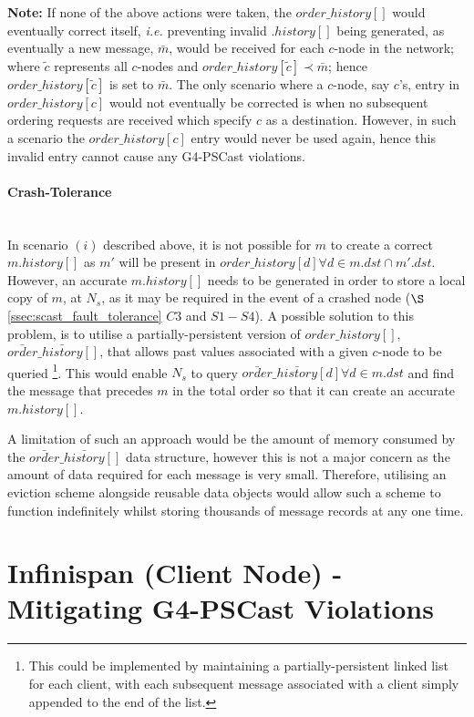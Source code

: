     \textbf{Note: } If none of the above actions were taken, the $order\_history[]$ would eventually correct itself, \emph{i.e.} preventing invalid $.history[]$ being generated, as eventually a new message, $\bar{m}$, would be received for each $c$-node in the network; where $\tilde{c}$ represents all $c$-nodes and $order\_history[\tilde{c}] \prec \bar{m}$; hence $order\_history[\tilde{c}]$ is set to $\bar{m}$.  The only scenario where a $c$-node, say $c$'s, entry in $order\_history[c]$ would not eventually be corrected is when no subsequent ordering requests are received which specify $c$ as a destination.  However, in such a scenario the $order\_history[c]$ entry would never be used again, hence this invalid entry cannot cause any G4-PSCast violations.  
    
    \paragraph{Crash-Tolerance} \hfill \\
    In scenario $(i)$ described above, it is not possible for $m$ to create a correct $m.history[]$ as $m'$ will be present in $order\_history[d] \forall d \in m.dst \cap m'.dst$.  However, an accurate $m.history[]$ needs to be generated in order to store a local copy of $m$, at $N_s$, as it may be required in the event of a crashed node ($\S$ \ref{ssec:scast_fault_tolerance} $C3$ and $S1-S4$).  A possible solution to this problem, is to utilise a partially-persistent version of $order\_history[]$, $\bar{order}\_\bar{history}[]$, that allows past values associated with a given $c$-node to be queried \footnote{This could be implemented by maintaining a partially-persistent linked list for each client, with each subsequent message associated with a client simply appended to the end of the list.}.  This would enable $N_s$ to query $\bar{order}\_\bar{history}[d] \forall d \in m.dst$ and find the message that precedes $m$ in the total order so that it can create an accurate $m.history[]$.
    
    A limitation of such an approach would be the amount of memory consumed by the $\bar{order}\_\bar{history}[]$ data structure, however this is not a major concern as the amount of data required for each message is very small.  Therefore, utilising an eviction scheme alongside reusable data objects would allow such a scheme to function indefinitely whilst storing thousands of message records at any one time.  

\section{Infinispan (Client Node) - Mitigating G4-PSCast Violations}

